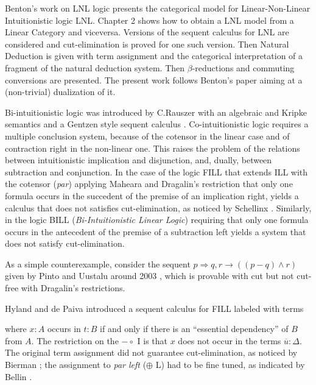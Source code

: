 \documentclass{lmcs}
\makeatletter
\newcommand{\limp}[0]{\multimap}
\def\ScoreOverhang{4pt}			%
\def\ScoreOverhangLeft{\ScoreOverhang}
\def\ScoreOverhangRight{\ScoreOverhang}
\def\extraVskip{2pt}			%
\def\ruleScoreFiller{\hrule}		%
\def\defaultScoreFiller{\ruleScoreFiller}  %
\def\defaultBuildScore{\buildSingleScore}  %
\def\defaultHypSeparation{\hskip.2in}   %
\def\labelSpacing{3pt}		%
\def\theHypSeparation{\defaultHypSeparation}
\def\alwaysScoreFiller{\defaultScoreFiller}	%
\def\alwaysBuildScore{\defaultBuildScore}
\def\theScoreFiller{\alwaysScoreFiller}	%
\def\buildScore{\alwaysBuildScore}   %
\def\hypKernAmt{0pt}	%
\def\defaultLeftLabel{}
\def\defaultRightLabel{}
\def\myTrue{Y}
\def\bottomAlignFlag{N}
\def\centerAlignFlag{N}
\def\newdimen{\alloc@1\dimen\dimendef\insc@unt}
\def\newbox{\alloc@4\box\chardef\insc@unt}
\def\thecur#1{\csname#1\number\theLevel\endcsname}
\def\allocatemore{%
	\ifnum\theLevel>\myMaxLevel%
		\expandafter\newbox\curBox%
		\expandafter\newdimen\curScoreStart%
		\expandafter\newdimen\curCenter%
		\expandafter\newdimen\curScoreEnd%
		\global\advance\myMaxLevel by1%
	\fi%
}
\def\prepAxiom{%
	\advance\theLevel by1%
	\edef\curBox{\thecur{myBox}}%
	\edef\curScoreStart{\thecur{myScoreStart}}%
	\edef\curCenter{\thecur{myCenter}}%
	\edef\curScoreEnd{\thecur{myScoreEnd}}%
	\allocatemore%
}
\def\AxiomC#1{		%
	\prepAxiom%
	\setbox\myBoxA=\hbox{#1}%
	\global\setbox\curBox =%
		\hbox{\hskip\ScoreOverhangLeft\relax%
                        \unhcopy\myBoxA\hskip\ScoreOverhangRight\relax}%
        \global\curScoreStart=0pt \relax
        \global\curScoreEnd=\wd\curBox \relax
        \global\curCenter=.5\wd\curBox \relax
        \global\advance \curCenter by \ScoreOverhangLeft%
	\ignorespaces
}
\def\prepUnary{%
	\ifnum \theLevel<1 
		\errmessage{Hypotheses missing!}
	\fi%
	\edef\curBox{\thecur{myBox}}%
	\edef\curScoreStart{\thecur{myScoreStart}}%
	\edef\curCenter{\thecur{myCenter}}%
	\edef\curScoreEnd{\thecur{myScoreEnd}}%
}
\def\UnaryInfC#1{
	\prepUnary%
	\buildConclusionC{#1}%
	\joinUnary%
	\resetInferenceDefaults%
	\ignorespaces%
}
\def\buildConclusionC#1{%
	\setbox\myBoxA=\hbox{#1}%
	\setbox\myBoxC =%
		\hbox{\hbox{\hskip\ScoreOverhangLeft\relax%
                        \unhcopy\myBoxA\hskip\ScoreOverhangRight\relax}}%
	\newScoreStart=0pt \relax%
	\newCenter=.5\wd\myBoxC \relax%
	\newScoreEnd=\wd\myBoxC%
        \advance \newCenter by \ScoreOverhangLeft%
}
\def\joinUnary{%
	\global\advance\curCenter by -\hypKernAmt%
	\ifnum\curCenter<\newCenter%
		\displace=\newCenter%
		\advance \displace by -\curCenter%
		\kernUpperBox%
	\else%
		\displace=\curCenter%
		\advance \displace by -\newCenter%
		\kernLowerBox%
	\fi%
        \ifnum \newScoreStart < \curScoreStart %
		\global \curScoreStart = \newScoreStart \fi%
	\ifnum \curScoreEnd < \newScoreEnd %
		\global \curScoreEnd = \newScoreEnd \fi%
	\ifnum \curScoreStart<\wd\myBoxLL%
		\global\displace = \wd\myBoxLL%
		\global\advance\displace by -\curScoreStart%
		\kernUpperBox%
		\kernLowerBox%
	\fi%
	\buildScore%
	\buildScoreLabels%
	\global \setbox \curBox =%
		\vbox{\box\curBox%
			\vskip\thisAboveSkip \relax%
			\nointerlineskip\box\myBoxD%
			\vskip\thisBelowSkip \relax%
			\nointerlineskip\box\myBoxC}%
	\global \curScoreStart=\newScoreStart%
	\global \curScoreEnd=\newScoreEnd%
	\global \curCenter=\newCenter%
}
\def\kernUpperBox{%
		\global\setbox\curBox =%
			\hbox{\hskip\displace\box\curBox}%
		\global\advance \curScoreStart by \displace%
		\global\advance \curScoreEnd by \displace%
		\global\advance\curCenter by \displace%
}
\def\kernLowerBox{%
		\global\setbox\myBoxC =%
			\hbox{\hskip\displace\unhbox\myBoxC}%
		\global\advance \newScoreStart by \displace%
		\global\advance \newScoreEnd by \displace%
		\global\advance\newCenter by \displace%
}
\def\DisplayProof{%
	\ifnum \theLevel=1 \relax \else%
		\errmessage{Proof tree badly specified.}%
	\fi%
	\edef\curBox{\thecur{myBox}}%
	\ifx\bottomAlignFlag\myTrue%
		\displace=0pt%
	\else%
		\displace=.5\ht\curBox%
		\ifx\centerAlignFlag\myTrue\relax
		\else%
		      	\advance\displace by -3pt%
		\fi%
	\fi%
	\leavevmode%
	\lower\displace\hbox{\copy\curBox}%
	\global\theLevel=0%
	\global\def\alwaysBuildScore{\defaultBuildScore}%
	\global\def\alwaysScoreFiller{\defaultScoreFiller}%
	\def\bottomAlignFlag{N}
	\def\centerAlignFlag{N}
	\resetInferenceDefaults%
	\ignorespaces
}
\def\buildSingleScore{%
	\displace=\curScoreEnd%
	\advance \displace by -\curScoreStart%
	\global\setbox \myBoxD =%
		\hbox to \displace{\expandafter\xleaders\theScoreFiller\hfill}%
}
\def\singleLine{%
	\gdef\buildScore{\buildSingleScore}%
	\ignorespaces
}
\def\insertBetweenHyps#1{%
	\gdef\theHypSeparation{#1}%
	\ignorespaces
}
\def\RightLabel#1{%
	\global\setbox\myBoxRL=\hbox{\hskip\labelSpacing #1}%
	\ignorespaces
}
\def\buildScoreLabels{%
	\scoreHeight = \ht\myBoxD%
	\scoreDepth = \dp\myBoxD%
	\leftLowerAmt=\ht\myBoxLL%
	\advance \leftLowerAmt by -\dp\myBoxLL%
	\advance \leftLowerAmt by -\scoreHeight%
	\advance \leftLowerAmt by \scoreDepth%
	\leftLowerAmt=.5\leftLowerAmt%
	\rightLowerAmt=\ht\myBoxRL%
	\advance \rightLowerAmt by -\dp\myBoxRL%
	\advance \rightLowerAmt by -\scoreHeight%
	\advance \rightLowerAmt by \scoreDepth%
	\rightLowerAmt=.5\rightLowerAmt%
	\displace = \curScoreStart%
	\advance\displace by -\wd\myBoxLL%
	\global\setbox\myBoxD =%
		\hbox{\hskip\displace%
			\lower\leftLowerAmt\copy\myBoxLL%
			\box\myBoxD%
			\lower\rightLowerAmt\copy\myBoxRL}%
	\global\thisAboveSkip = \ht\myBoxLL%
	\global\advance \thisAboveSkip by -\leftLowerAmt%
	\global\advance \thisAboveSkip by -\scoreHeight%
	\ifnum \thisAboveSkip<0 %
		\global\thisAboveSkip=0pt%
	\fi%
	\displace = \ht\myBoxRL%
	\advance \displace by -\rightLowerAmt%
	\advance \displace by -\scoreHeight%
	\ifnum \displace<0 %
		\displace=0pt%
	\fi%
	\ifnum \displace>\thisAboveSkip %
		\global\thisAboveSkip=\displace%
	\fi%
	\global\thisBelowSkip = \dp\myBoxLL%
	\global\advance\thisBelowSkip by \leftLowerAmt%
	\global\advance\thisBelowSkip by -\scoreDepth%
	\ifnum\thisBelowSkip<0 %
		\global\thisBelowSkip = 0pt%
	\fi%
	\displace = \dp\myBoxLL%
	\advance\displace by \rightLowerAmt%
	\advance\displace by -\scoreDepth%
	\ifnum\displace<0 %
		\displace = 0pt%
	\fi%
	\ifnum\displace>\thisBelowSkip%
		\global\thisBelowSkip = \displace%
	\fi
	\global\thisAboveSkip = -\thisAboveSkip%
	\global\thisBelowSkip = -\thisBelowSkip%
	\global\advance\thisAboveSkip by\extraVskip%
	\global\advance\thisBelowSkip by\extraVskip%
}
\def\resetInferenceDefaults{%
	\global\def\theHypSeparation{\defaultHypSeparation}%
	\global\setbox\myBoxLL=\hbox{\defaultLeftLabel}%
	\global\setbox\myBoxRL=\hbox{\defaultRightLabel}%
	\global\def\buildScore{\alwaysBuildScore}%
	\global\def\theScoreFiller{\alwaysScoreFiller}%
	\gdef\hypKernAmt{0pt}%
}
\def\limp{\mathrel{-\!\circ}}
\def\lsub{\mathrel{\bullet\!-}}
\makeatother
\begin{document}
Benton's work \cite{Benton:1994} on LNL logic presents the categorical
model for Linear-Non-Linear Intuitionistic logic LNL.  Chapter 2 shows
how to obtain a LNL model from a Linear Category and viceversa.
Versions of the sequent calculus for LNL are considered and
cut-elimination is proved for one such version. Then Natural Deduction
is given with term assignment and the categorical interpretation of a
fragment of the natural deduction system. Then $\beta$-reductions and
commuting conversions are presented.  The present work follows
Benton's paper aiming at a (non-trivial) dualization of it.

Bi-intuitionistic logic was introduced by C.Rauszer
\cite{Rauszer:1974} with an algebraic and Kripke semantics
\cite{Rauszer:1980} and a Gentzen style sequent calculus
\cite{Rauszer:1974a}.  Co-intuitionistic logic requires a multiple
conclusion system, because of the cotensor in the linear case and of
contraction right in the non-linear one.  This raises the problem of
the relations between intuitionistic implication and disjunction, and,
dually, between subtraction and conjunction.  In the case of the logic
FILL that extends ILL with the cotensor (\emph{par}) applying Maheara
and Dragalin's restriction that only one formula occurs in the
succedent of the premise of an implication right, yields a calculus
that does not satisfies cut-elimination, as noticed by Schellinx
\cite{Schellinx:1991}. Similarly, in the logic BILL
(\emph{Bi-Intuitionistic Linear Logic}) requiring that only one
formula occurs in the antecedent of the premise of a subtraction left
yields a system that does not satisfy cut-elimination.

\begin{center}
\end{center}
As a simple counterexample, consider the sequent $p \Rightarrow q, r
\rightarrow ((p - q) \wedge r)$ given by Pinto and Uustalu around 2003
\cite{Pinto-Uustalu:2010}, which is provable with cut but not cut-free
with Dragalin's restrictions.

Hyland and de Paiva introduced a sequent calculus for FILL labeled
with terms
\begin{center}
\end{center}
where $x: A$ occurs in $t:B$ if and only if there is an ``essential
dependency'' of $B$ from $A$.  The restriction on the $\limp$ I is
that $x$ does not occur in the terms $\overline{u}:\Delta$.  The
original term assignment did not guarantee cut-elimination, as noticed
by Bierman \cite{Bierman:1996}; the assignment to \emph{par left}
($\oplus$ L) had to be fine tuned, as indicated by Bellin
\cite{Bellin:1997}.
\end{document}
